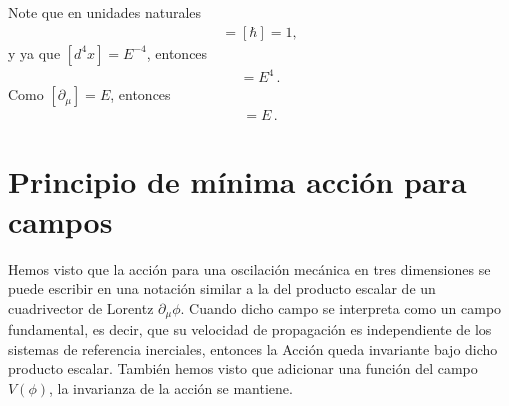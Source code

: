 \begin{frame}
Note que en unidades naturales
\begin{align}
  [S]=[\hbar]=1,
\end{align}
y ya que $[d^4x]=E^{-4}$, entonces
\begin{align}
  [\mathcal{L}]=E^{4}\,.
\end{align}
Como $[\partial_{\mu}]=E$, entonces
\begin{align}
  [\phi]=E\,.
\end{align}

\end{frame}
 
\section{Principio de mínima acción para campos}
Hemos visto que la acción para una oscilación mecánica en tres dimensiones se puede escribir en una notación similar a la del producto escalar de un cuadrivector de Lorentz $\partial_\mu\phi$. Cuando dicho campo se interpreta como un campo fundamental, es decir, que su velocidad de propagación es independiente de los sistemas de referencia inerciales, entonces la Acción queda invariante bajo dicho producto escalar. También hemos visto que adicionar una función del campo $V(\phi)$, la invarianza de la acción se mantiene.


